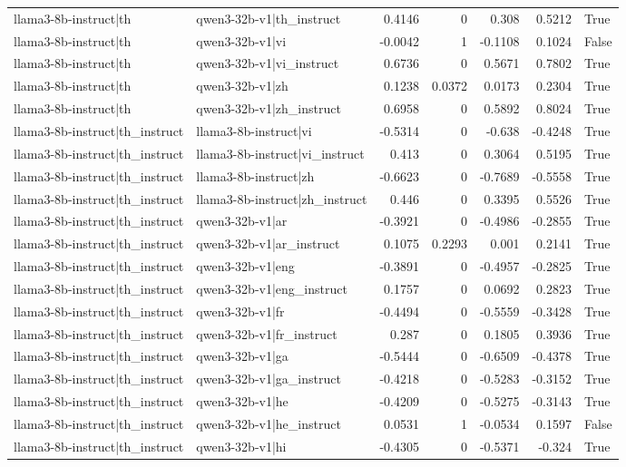 \begin{table}
\begin{tabular}{l l r r r r l}
llama3-8b-instruct|th & qwen3-32b-v1|th_instruct & 0.4146 & 0 & 0.308 & 0.5212 & True \\
llama3-8b-instruct|th & qwen3-32b-v1|vi & -0.0042 & 1 & -0.1108 & 0.1024 & False \\
llama3-8b-instruct|th & qwen3-32b-v1|vi_instruct & 0.6736 & 0 & 0.5671 & 0.7802 & True \\
llama3-8b-instruct|th & qwen3-32b-v1|zh & 0.1238 & 0.0372 & 0.0173 & 0.2304 & True \\
llama3-8b-instruct|th & qwen3-32b-v1|zh_instruct & 0.6958 & 0 & 0.5892 & 0.8024 & True \\
llama3-8b-instruct|th_instruct & llama3-8b-instruct|vi & -0.5314 & 0 & -0.638 & -0.4248 & True \\
llama3-8b-instruct|th_instruct & llama3-8b-instruct|vi_instruct & 0.413 & 0 & 0.3064 & 0.5195 & True \\
llama3-8b-instruct|th_instruct & llama3-8b-instruct|zh & -0.6623 & 0 & -0.7689 & -0.5558 & True \\
llama3-8b-instruct|th_instruct & llama3-8b-instruct|zh_instruct & 0.446 & 0 & 0.3395 & 0.5526 & True \\
llama3-8b-instruct|th_instruct & qwen3-32b-v1|ar & -0.3921 & 0 & -0.4986 & -0.2855 & True \\
llama3-8b-instruct|th_instruct & qwen3-32b-v1|ar_instruct & 0.1075 & 0.2293 & 0.001 & 0.2141 & True \\
llama3-8b-instruct|th_instruct & qwen3-32b-v1|eng & -0.3891 & 0 & -0.4957 & -0.2825 & True \\
llama3-8b-instruct|th_instruct & qwen3-32b-v1|eng_instruct & 0.1757 & 0 & 0.0692 & 0.2823 & True \\
llama3-8b-instruct|th_instruct & qwen3-32b-v1|fr & -0.4494 & 0 & -0.5559 & -0.3428 & True \\
llama3-8b-instruct|th_instruct & qwen3-32b-v1|fr_instruct & 0.287 & 0 & 0.1805 & 0.3936 & True \\
llama3-8b-instruct|th_instruct & qwen3-32b-v1|ga & -0.5444 & 0 & -0.6509 & -0.4378 & True \\
llama3-8b-instruct|th_instruct & qwen3-32b-v1|ga_instruct & -0.4218 & 0 & -0.5283 & -0.3152 & True \\
llama3-8b-instruct|th_instruct & qwen3-32b-v1|he & -0.4209 & 0 & -0.5275 & -0.3143 & True \\
llama3-8b-instruct|th_instruct & qwen3-32b-v1|he_instruct & 0.0531 & 1 & -0.0534 & 0.1597 & False \\
llama3-8b-instruct|th_instruct & qwen3-32b-v1|hi & -0.4305 & 0 & -0.5371 & -0.324 & True \\

\end{tabular}
\end{table}
